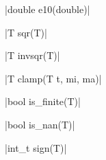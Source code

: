 \funcitem \vectorfunc \cppinline|double e10(double)| 

\funcitem \vectorfunc \cppinline|T sqr(T)| 

\funcitem \vectorfunc \cppinline|T invsqr(T)| 

\funcitem \vectorfunc \cppinline|T clamp(T t, mi, ma)| 

\funcitem \vectorfunc \cppinline|bool is_finite(T)| 

\funcitem \vectorfunc \cppinline|bool is_nan(T)| 

\funcitem \vectorfunc \cppinline|int_t sign(T)| 
